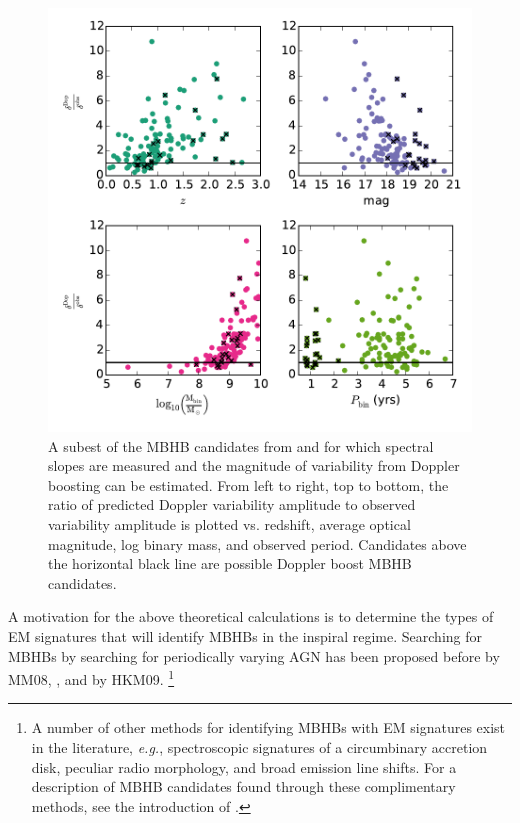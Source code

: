 \begin{figure}
\begin{center}
\includegraphics[scale=0.55]{figures/ch0/PTF_xsiGtr1_vs_z_M_P_alph_I90} 
\end{center}
\caption{A subest of the MBHB candidates from \citep{Graham+2015b} and \citep[][denoted by black x's]{Charisi+2016} for which spectral slopes are measured and the magnitude of variability from Doppler boosting can be estimated. From left to right, top to bottom, the ratio of predicted Doppler variability amplitude to observed variability amplitude is plotted vs. redshift, average optical magnitude, log binary mass, and observed period. Candidates above the horizontal black line are possible Doppler boost MBHB candidates.}
\label{Fig:DopCan}
\end{figure}


A motivation for the above theoretical calculations is to
determine the types of EM signatures that will identify MBHBs in the inspiral
regime. Searching for MBHBs by searching for periodically varying AGN has been
proposed before by MM08, \cite{Haiman+2009}, and by HKM09. \footnote{A number
of other methods for identifying MBHBs with EM signatures exist in the
literature, \textit{e.g.}, spectroscopic signatures of a circumbinary accretion
disk, peculiar radio morphology, and broad emission line shifts. For a description of
MBHB candidates found through these complimentary methods, see the
introduction of \cite{Charisi+2016}.}
 

